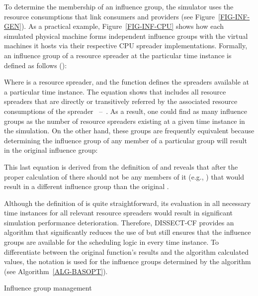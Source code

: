 \documentclass[sort, compress, 5p]{elsarticle}
\begin{document}
To determine the membership of an influence group, the simulator uses the resource consumptions that link consumers and providers (see Figure~\ref{FIG-INF-GEN}). As a practical example, Figure~\ref{FIG-INF-CPU} shows how each simulated physical machine forms independent influence groups with the virtual machines it hosts via their respective CPU spreader implementations. Formally, an influence group of a resource spreader at the particular time instance is defined as follows ():

Where    is a resource spreader, and the function  defines the spreaders available at a particular time instance. The equation shows that  includes all resource spreaders that are directly or transitively referred by the associated resource consumptions of the spreader ~--~.  As a result, one could find as many influence groups as the number of resource spreaders existing at a given time instance in the simulation. On the other hand, these groups are frequently equivalent because determining the influence group of any member of a particular group will result in the original influence group:

This last equation is derived from the definition of  and reveals that after the proper calculation of  there should not be any members of it (e.g., ) that would result in a different influence group than the original .

Although the definition of  is quite straightforward, its evaluation in all necessary time instances for all relevant resource spreaders would result in significant simulation performance deterioration. Therefore, DISSECT-CF provides an algorithm that significantly reduces the use of  but still ensures that the influence groups are available for the scheduling logic in every time instance. To differentiate between the original function's results and the algorithm calculated values, the notation  is used for the influence groups determined by the algorithm (see Algorithm~\ref{ALG-BASOPT}).

\begin{algorithm}[tb]
\begin{algorithmic}[1]\small
\REQUIRE  {}
\STATE 
\REPEAT \label{LIN-EXT-START}
\STATE  \label{LIN-EMPTYEXT}  
\FORALL{}
\STATE  \label{LIN-IDENTADD}
\FORALL{}
\STATE  \label{LIN-EXTGADD}
\ENDFOR
\ENDFOR
\STATE  {} \label{LIN-REALEXT}
\FORALL{}
\STATE 
\ENDFOR \label{LIN-IGEXTCOMPLETE}
\UNTIL{} \label{LIN-EXT-STOP}
\IF{} \label{LIN-SPLIT-START}
\STATE 
\REPEAT
\STATE  {} \label{LIN-RANDSEL}
\STATE  {} \label{LIN-CORRECT-GROUP}
\STATE  {}
\FORALL{}\label{LIN-SPLIT-UPD-START}
\STATE 
\ENDFOR\label{LIN-SPLIT-UPD-STOP}
\UNTIL{}
\ENDIF \label{LIN-SPLIT-STOP}
\end{algorithmic}
\caption{Influence group management\label{ALG-BASOPT}}
\end{algorithm}
\end{document}
